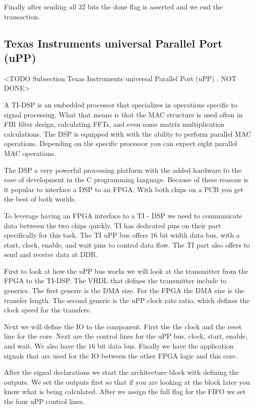 Finally after sending all $32$ bits the done flag is asserted and we end the transaction. 
	
	
\subsection{Texas Instruments universal Parallel Port (uPP)}
	<TODO Subsection Texas Instruments universal Parallel Port (uPP) : NOT DONE>
	
A \ac{TI}-\ac{DSP} is an embedded processor that specializes in operations specific to signal processing. What that means is that the \ac{MAC} structure is used often in \ac{FIR} filter design, calculating \ac{FFT}s, and even some matrix multiplication calculations. The \ac{DSP} is equipped with with the ability to perform parallel \ac{MAC} operations. Depending on the specific processor you can expect eight parallel \ac{MAC} operations. 

The \ac{DSP} a very powerful processing platform with the added hardware to the ease of development in the C programming language. Because of these reasons is it popular to interface a \ac{DSP} to an \ac{FPGA}. With both chips on a \ac{PCB} you get the best of both worlds. 

To leverage having an \ac{FPGA} interface to a \ac{TI} - \ac{DSP} we need to communicate data between the two chips quickly. \ac{TI} has dedicated pins on their part specifically for this task. The \ac{TI} \ac{uPP} bus offers $16$ bit width data bus, with a start, clock, enable, and wait pins to control data flow. The \ac{TI} part also offers to send and receive data at \ac{DDR}. 

First to look at how the \ac{uPP} bus works we will look at the transmitter from the \ac{FPGA} to the \ac{TI}-\ac{DSP}. The \ac{VHDL} that defines the transmitter include to generics. The first generic is the \ac{DMA} size. For the \ac{FPGA} the \ac{DMA} size is the transfer length. The second generic is the \ac{uPP} clock rate ratio, which defines the clock speed for the transfers. 

Next we will define the \ac{IO} to the component. First the the clock and the reset line for the core. Next are the control lines for the \ac{uPP} bus, clock, start, enable, and wait. We also have the $16$ bit data bus. Finally we have the application signals that are used for the \ac{IO} between the other \ac{FPGA} logic and this core. 

After the signal declarations we start the architecture block with defining the outputs. We set the outputs first so that if you are looking at the block later you know what is being calculated. After we assign the full flag for the \ac{FIFO} we set the four \ac{uPP} control lines. 

